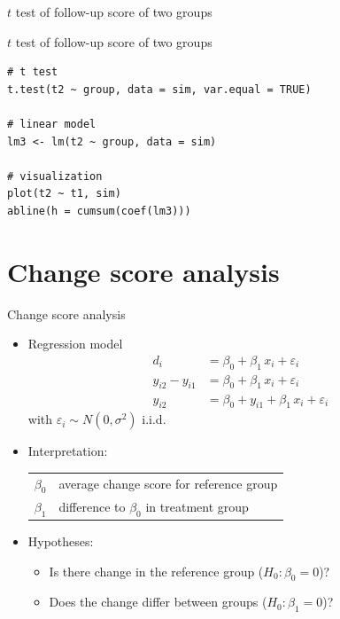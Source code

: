 \documentclass[aspectratio=169]{beamer}
\begin{document}
\begin{frame}{$t$ test of follow-up score of two groups}
\begin{center}
\end{center}
\end{frame}

\begin{frame}[fragile]{$t$ test of follow-up score of two groups}
\begin{lstlisting}
# t test
t.test(t2 ~ group, data = sim, var.equal = TRUE)

# linear model
lm3 <- lm(t2 ~ group, data = sim)

# visualization
plot(t2 ~ t1, sim)
abline(h = cumsum(coef(lm3)))
\end{lstlisting}
\end{frame}

\section{Change score analysis}

\begin{frame}[<+->]{Change score analysis}
\begin{itemize}
  \item Regression model
    \begin{align*}
                  d_i &= \beta_0 + \beta_1 \, x_i + \varepsilon_i \\
      y_{i2} - y_{i1} &= \beta_0 + \beta_1 \, x_i + \varepsilon_i \\
               y_{i2} &= \beta_0 + y_{i1} + \beta_1 \, x_i + \varepsilon_i
    \end{align*}
    with $\varepsilon_i \sim N(0, \sigma^2)$ i.i.d.
  \item Interpretation:
    \begin{tabular}{lp{10cm}}
    $\beta_0$ & average change score for reference group\\
    $\beta_1$ & difference to $\beta_0$ in treatment group
    \end{tabular}
  \item Hypotheses:
    \begin{itemize}
        \item Is there change in the reference group ($H_0\colon \beta_0 = 0$)?
        \item Does the change differ between groups ($H_0\colon \beta_1 =0$)?
    \end{itemize}
\end{itemize}
\end{frame}
\end{document}
